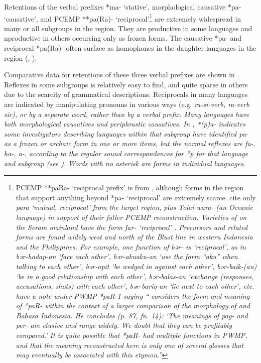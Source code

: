 Retentions of the verbal prefixes *ma- ‘stative’,
morphological causative *pa- ‘causative’,
and PCEMP **pa(Ra)- ‘reciprocal’\footnote{
		PCEMP **paRa- ‘reciprocal
		prefix’ is from \citet{BlustTrussel2020},
		although forms in the region that support anything beyond *pa-
		‘reciprocal’ are extremely scarce.
		\citet{BlustTrussel2020} cite only  \it{para} ‘mutual,
		reciprocal’ from the target region,
		plus Tolai \it{wara-} (an Oceanic language) in support of their fuller PCEMP reconstruction.
		Varieties of  on the Seram mainland have the form \it{far-}
		‘reciprocal’ \citep{Loski-Grimes1990}.
		Precursors and related forms are found widely west
		and north of the Blust line in western Indonesia and the Philippines.
		For example, one function of  \it{bər-} is ‘reciprocal’,
		as in \it{bər-hadap-an} ‘face each other’,
		\it{bər-aku{\tl}aku-an} ‘use the form “\it{aku}” when talking
		to each other’, \it{bər-apit} ‘be wedged in against each other’,
		\it{bər-baik-(an)} ‘be in a good relationship with each other’,
		\it{bər-balas-an} ‘exchange (responses, accusations,
		shots) with each other’,
		\it{bər-bariŋ-an} ‘lie next to each other’, etc.
		\citet{BlustTrussel2020} have a note under PWMP *paR-1 saying
		“\citet{Wolff1981} considers the form
		and meaning of *paR- within the context of a larger comparison
		of the morphology of  and Bahasa Indonesia.
		He concludes (p. 87, fn. 14): ‘The meanings of \it{pag-}
		and \it{per-} are elusive and range widely.
		We doubt that they can be profitably compared.’ It is quite possible
		that *paR- had multiple functions in PWMP,
		and that the meaning reconstructed here is only one of several
		glosses that may eventually be associated with this etymon.”}
are extremely widespread in many or all subgroups in the region.
They are productive in some languages and
nproductive in others occurring only as frozen forms.
The causative *pa- and reciprocal *pa(Ra)- often surface as homophones
in the daughter languages in the region
(\citealp[113--115]{Grimes1991c}, \citealp{Grimes2008,GrimesRanohAplugi2008}).

Comparative data for retentions of these three verbal prefixes
are shown in .
Reflexes in some subgroups is relatively easy to find,
and quite sparse in others due to the scarcity of grammatical descriptions.
Reciprocals in many languages are indicated by manipulating 
pronouns in various ways (e.g.
\it{ra-si}-verb, \it{ra}-verb \it{sir}), or by a separate word,
rather than by a verbal prefix.
Many languages have both morphological causatives and periphrastic causatives.
In , *(p)a- indicates some investigators describing
languages within that subgroup have identified \it{pa-} as a
frozen or archaic form in one or more items,
but the normal reflexes are \it{fa-,
ha-, a-}, according to the regular sound correspondences for
*p for that language
and subgroup (see ).
Words with no asterisk are forms in individual languages.

